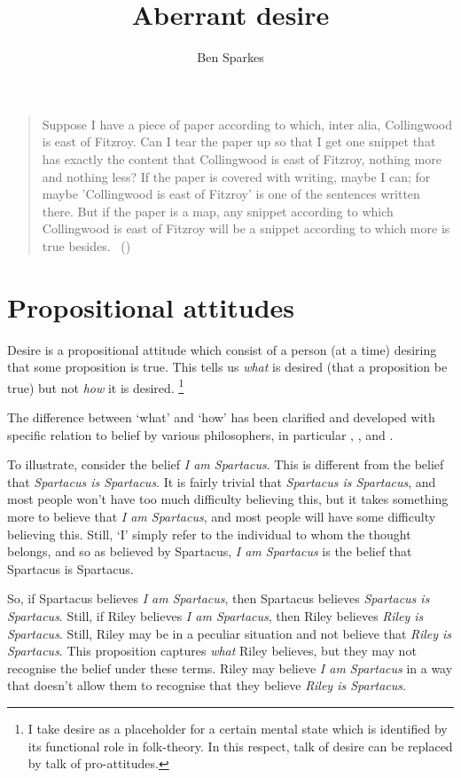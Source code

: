 \documentclass[10pt]{article}
\title{Aberrant desire}
\author{Ben Sparkes}
\begin{document}
\maketitle

\begin{quote}
  Suppose I have a piece of paper according to which, inter alia, Collingwood is east of Fitzroy.
  Can I tear the paper up so that I get one snippet that has exactly the content that Collingwood is east of Fitzroy, nothing more and nothing less?
  If the paper is covered with writing, maybe I can; for maybe 'Collingwood is east of Fitzroy' is one of the sentences written there.
  But if the paper is a map, any snippet according to which Collingwood is east of Fitzroy will be a snippet according to which more is true besides.\nolinebreak
  \mbox{ }\hfill(\citeyear[310]{Lewis:1999ab})
\end{quote}

\section{Propositional attitudes}
\label{sec:prop-attit-1}

Desire is a propositional attitude which consist of a person (at a time) desiring that some proposition is true.
This tells us \emph{what} is desired (that a proposition be true) but not \emph{how} it is desired.\nolinebreak
\footnote{
  I take desire as a placeholder for a certain mental state which is identified by its functional role in folk-theory.
  In this respect, talk of desire can be replaced by talk of pro-attitudes.
}

The difference between `what' and `how' has been clarified and developed with specific relation to belief by various philosophers, in particular \citeauthor{Kaplan:1989aa}, \citeauthor{Lewis:1979aa}, and \citeauthor{Perry:1993aa}.

To illustrate, consider the belief \emph{I am Spartacus}.
This is different from the belief that \emph{Spartacus is Spartacus}.
It is fairly trivial that \emph{Spartacus is Spartacus}, and most people won't have too much difficulty believing this, but it takes something more to believe that \emph{I am Spartacus}, and most people will have some difficulty believing this.
Still, `I' simply refer to the individual to whom the thought belongs, and so as believed by Spartacus, \emph{I am Spartacus} is the belief that Spartacus is Spartacus.

So, if Spartacus believes \emph{I am Spartacus}, then Spartacus believes \emph{Spartacus is Spartacus}.
Still, if Riley believes \emph{I am Spartacus}, then Riley believes \emph{Riley is Spartacus}.
Still, Riley may be in a peculiar situation and not believe that \emph{Riley is Spartacus}.
This proposition captures \emph{what} Riley believes, but they may not recognise the belief under these terms.
Riley may believe \emph{I am Spartacus} in a way that doesn't allow them to recognise that they believe \emph{Riley is Spartacus}.
\end{document}
